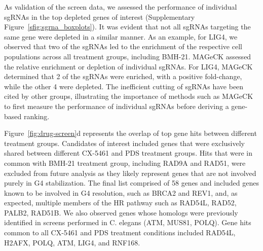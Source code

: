 As validation of the screen data, we assessed the performance of individual sgRNAs in the top depleted genes of interest (Supplementary Figure~\ref{sfig:sgrna_boxplots}). 
It was evident that not all sgRNAs targeting the same gene were depleted in a similar manner. 
As an example, for LIG4, we observed that two of the sgRNAs led to the enrichment of the respective cell populations across all treatment groups, including BMH-21. MAGeCK assessed the relative enrichment or depletion of individual sgRNAs. 
For LIG4, MAGeCK determined that 2 of the sgRNAs were enriched, with a positive fold-change, while the other 4 were depleted. 
The inefficient cutting of sgRNAs have been cited by other groups\cite{Doench2014,Doench2017}, illustrating the importance of methods such as MAGeCK to first measure the performance of individual sgRNAs before deriving a gene-based ranking.

Figure~\ref{fig:drug-screen}d represents the overlap of top gene hits between different treatment groups. 
Candidates of interest included genes that were exclusively shared between different CX-5461 and PDS treatment groups. 
Hits that were in common with BMH-21 treatment group, including RAD9A and RAD51, were excluded from future analysis as they likely represent genes that are not involved purely in G4 stabilization. 
The final list comprised of 58 genes and included genes known to be involved in G4 resolution, such as BRCA2 and REV1, and, as expected, multiple members of the HR pathway such as RAD54L, RAD52, PALB2, RAD51B. 
We also observed genes whose homologs were previously identified in screens performed in C. elegans (ATM, MUS81, POLQ)\cite{Xu2017}. Gene hits common to all CX-5461 and PDS treatment conditions included RAD54L, H2AFX, POLQ, ATM, LIG4, and RNF168.

